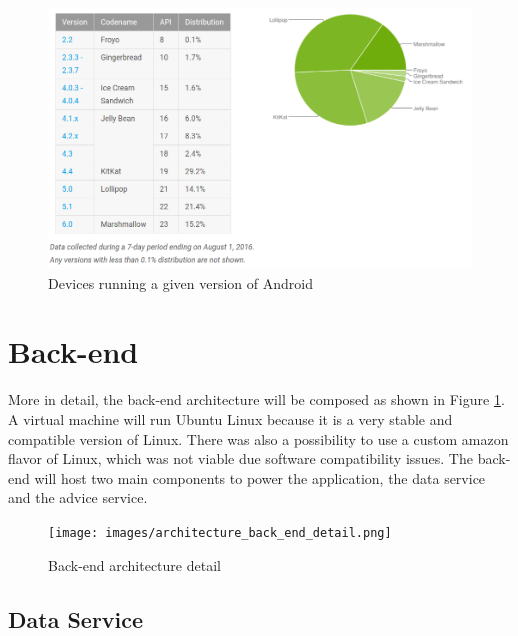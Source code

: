 \begin{figure}[H]
\begin{adjustbox}{width=1\textwidth,center=\textwidth}
  \centering
  \includegraphics[scale=1]{images/android_platform_versions.png}
\end{adjustbox}
  \caption[Devices running a given version of Android]{Devices running a given version of Android \footnotemark}
\end{figure}

\section{Back-end}
More in detail, the back-end architecture will be composed as shown in Figure \ref{fig:architecture_back_end_detail}. A virtual machine will run Ubuntu Linux because it is a very stable and compatible version of Linux. There was also a possibility to use a custom amazon flavor of Linux, which was not viable due software compatibility issues. The back-end will host two main components to power the application, the data service and the advice service. 

\begin{figure}[H]
\begin{adjustbox}{width=.6\textwidth,center=\textwidth}
  \centering
  \texttt{[image: images/architecture\_back\_end\_detail.png]}
\end{adjustbox}
  \caption[Back-end architecture]{Back-end architecture detail}
  \label{fig:architecture_back_end_detail}
\end{figure}


\subsection{Data Service}

